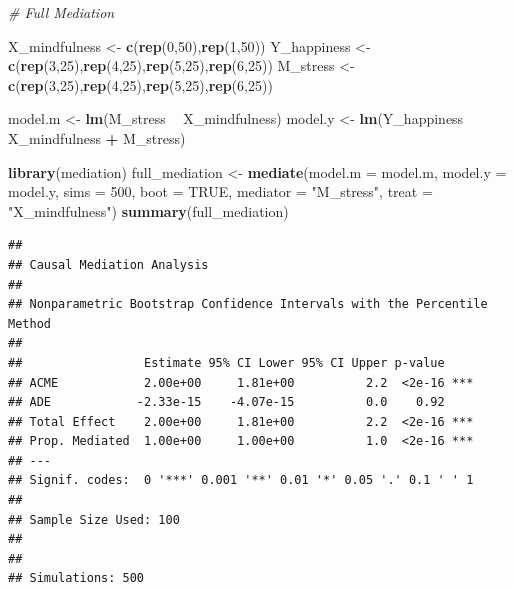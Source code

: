 \documentclass[]{book}
\newenvironment{Shaded}{\begin{snugshade}}{\end{snugshade}}
\newcommand{\CommentTok}[1]{\textcolor[rgb]{0.56,0.35,0.01}{\textit{#1}}}
\newcommand{\DataTypeTok}[1]{\textcolor[rgb]{0.13,0.29,0.53}{#1}}
\newcommand{\DecValTok}[1]{\textcolor[rgb]{0.00,0.00,0.81}{#1}}
\newcommand{\KeywordTok}[1]{\textcolor[rgb]{0.13,0.29,0.53}{\textbf{#1}}}
\newcommand{\NormalTok}[1]{#1}
\newcommand{\OperatorTok}[1]{\textcolor[rgb]{0.81,0.36,0.00}{\textbf{#1}}}
\newcommand{\OtherTok}[1]{\textcolor[rgb]{0.56,0.35,0.01}{#1}}
\newcommand{\StringTok}[1]{\textcolor[rgb]{0.31,0.60,0.02}{#1}}
\begin{document}
\begin{Shaded}
\begin{Highlighting}[]
\CommentTok{# Full Mediation}

\NormalTok{X_mindfulness <-}\StringTok{ }\KeywordTok{c}\NormalTok{(}\KeywordTok{rep}\NormalTok{(}\DecValTok{0}\NormalTok{,}\DecValTok{50}\NormalTok{),}\KeywordTok{rep}\NormalTok{(}\DecValTok{1}\NormalTok{,}\DecValTok{50}\NormalTok{))}
\NormalTok{Y_happiness <-}\StringTok{ }\KeywordTok{c}\NormalTok{(}\KeywordTok{rep}\NormalTok{(}\DecValTok{3}\NormalTok{,}\DecValTok{25}\NormalTok{),}\KeywordTok{rep}\NormalTok{(}\DecValTok{4}\NormalTok{,}\DecValTok{25}\NormalTok{),}\KeywordTok{rep}\NormalTok{(}\DecValTok{5}\NormalTok{,}\DecValTok{25}\NormalTok{),}\KeywordTok{rep}\NormalTok{(}\DecValTok{6}\NormalTok{,}\DecValTok{25}\NormalTok{))}
\NormalTok{M_stress  <-}\StringTok{ }\KeywordTok{c}\NormalTok{(}\KeywordTok{rep}\NormalTok{(}\DecValTok{3}\NormalTok{,}\DecValTok{25}\NormalTok{),}\KeywordTok{rep}\NormalTok{(}\DecValTok{4}\NormalTok{,}\DecValTok{25}\NormalTok{),}\KeywordTok{rep}\NormalTok{(}\DecValTok{5}\NormalTok{,}\DecValTok{25}\NormalTok{),}\KeywordTok{rep}\NormalTok{(}\DecValTok{6}\NormalTok{,}\DecValTok{25}\NormalTok{))}

\NormalTok{model.m <-}\StringTok{ }\KeywordTok{lm}\NormalTok{(M_stress }\OperatorTok{~}\StringTok{ }\NormalTok{X_mindfulness)}
\NormalTok{model.y <-}\StringTok{ }\KeywordTok{lm}\NormalTok{(Y_happiness }\OperatorTok{~}\StringTok{ }\NormalTok{X_mindfulness }\OperatorTok{+}\StringTok{ }\NormalTok{M_stress)}

\KeywordTok{library}\NormalTok{(mediation)}
\NormalTok{full_mediation <-}\StringTok{ }\KeywordTok{mediate}\NormalTok{(}\DataTypeTok{model.m =}\NormalTok{ model.m,}
                       \DataTypeTok{model.y =}\NormalTok{ model.y,}
                       \DataTypeTok{sims =} \DecValTok{500}\NormalTok{,}
                       \DataTypeTok{boot =} \OtherTok{TRUE}\NormalTok{,}
                       \DataTypeTok{mediator =} \StringTok{"M_stress"}\NormalTok{,}
                       \DataTypeTok{treat =} \StringTok{"X_mindfulness"}\NormalTok{)}
\KeywordTok{summary}\NormalTok{(full_mediation)}
\end{Highlighting}
\end{Shaded}

\begin{verbatim}
## 
## Causal Mediation Analysis 
## 
## Nonparametric Bootstrap Confidence Intervals with the Percentile Method
## 
##                 Estimate 95% CI Lower 95% CI Upper p-value    
## ACME            2.00e+00     1.81e+00          2.2  <2e-16 ***
## ADE            -2.33e-15    -4.07e-15          0.0    0.92    
## Total Effect    2.00e+00     1.81e+00          2.2  <2e-16 ***
## Prop. Mediated  1.00e+00     1.00e+00          1.0  <2e-16 ***
## ---
## Signif. codes:  0 '***' 0.001 '**' 0.01 '*' 0.05 '.' 0.1 ' ' 1
## 
## Sample Size Used: 100 
## 
## 
## Simulations: 500
\end{verbatim}
\end{document}
